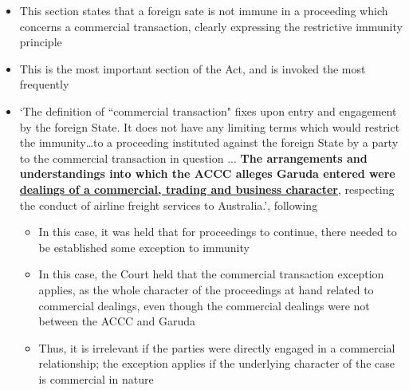 \begin{itemize}
    \item This section states that a foreign sate is not immune in a proceeding which concerns a commercial transaction, clearly expressing the restrictive immunity principle
    \item This is the most important section of the Act, and is invoked the most frequently
    \item `The definition of ``commercial transaction" fixes upon entry and engagement by the foreign State. It does not have any limiting terms which would restrict the immunity…to a proceeding instituted against the foreign State by a party to the commercial transaction in question ... \textbf{The arrangements and understandings into which the ACCC alleges Garuda entered were \underline{dealings of a commercial, trading and business character}}, respecting the conduct of airline freight services to Australia.', following 
    \begin{itemize}
        \item In this case, it was held that for proceedings to continue, there needed to be established some exception to immunity
        \item In this case, the Court held that the commercial transaction exception applies, as the whole character of the proceedings at hand related to commercial dealings, even though the commercial dealings were not between the ACCC and Garuda
        \item Thus, it is irrelevant if the parties were directly engaged in a commercial relationship; the exception applies if the underlying character of the case is commercial in nature
    \end{itemize}
\end{itemize}

